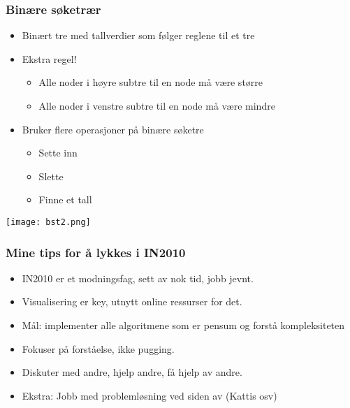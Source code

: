 \documentclass[norsk, handout]{beamer}
\begin{document}
    \begin{frame}
        \frametitle{Binære søketrær}
        \begin{itemize}
            \item Binært tre med tallverdier som følger reglene til et tre
            \item Ekstra regel!
            \begin{itemize}
                \item Alle noder i høyre subtre til en node må være større
                \item Alle noder i venstre subtre til en node må være mindre
            \end{itemize}
            \item Bruker flere operasjoner på binære søketre
                \begin{itemize}
                    \item Sette inn
                    \item Slette
                    \item Finne et tall
                \end{itemize}
        \end{itemize}

    \end{frame}

    \begin{frame}
        \texttt{[image: bst2.png]}
    \end{frame}

    \begin{frame}
        \frametitle{Mine tips for å lykkes i IN2010}
        \begin{itemize}
            \item IN2010 er et modningsfag, sett av nok tid, jobb jevnt.
            \item Visualisering er key, utnytt online ressurser for det.
            \item Mål: implementer alle algoritmene som er pensum og forstå kompleksiteten
            \item Fokuser på forståelse, ikke pugging.
            \item Diskuter med andre, hjelp andre, få hjelp av andre.
            \item Ekstra: Jobb med problemløsning ved siden av (Kattis osv)
        \end{itemize}
    \end{frame}
\end{document}
